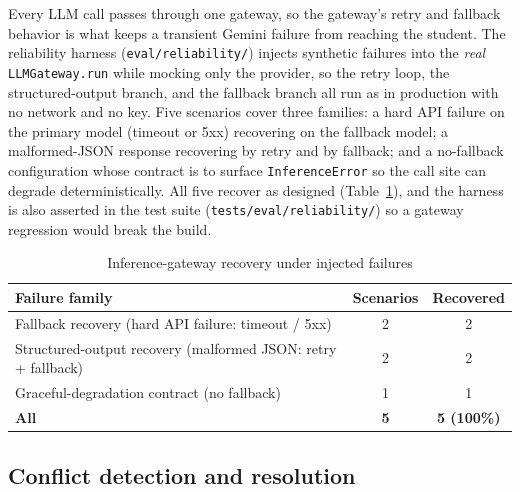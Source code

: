 \documentclass[../main.tex]{subfiles}
\begin{document}
Every \gls{LLM} call passes through one gateway, so the gateway's retry and fallback behavior is what keeps a transient Gemini failure from reaching the student.
The reliability harness (\texttt{eval/reliability/}) injects synthetic failures into the \textit{real} \texttt{LLMGateway.run} while mocking only the provider, so the retry loop, the structured-output branch, and the fallback branch all run as in production with no network and no key.
Five scenarios cover three families: a hard \gls{API} failure on the primary model (timeout or 5xx) recovering on the fallback model; a malformed-JSON response recovering by retry and by fallback; and a no-fallback configuration whose contract is to surface \texttt{InferenceError} so the call site can degrade deterministically.
All five recover as designed (Table~\ref{table:eval-reliability}), and the harness is also asserted in the test suite (\texttt{tests/eval/reliability/}) so a gateway regression would break the build.

\begin{table}[H]
    \centering
    \caption{Inference-gateway recovery under injected failures}
    \label{table:eval-reliability}
    \begin{tabular}{|p{8.5cm}|c|c|}
        \hline
        \textbf{Failure family} & \textbf{Scenarios} & \textbf{Recovered} \\
        \hline
        Fallback recovery (hard API failure: timeout / 5xx) & 2 & 2 \\
        \hline
        Structured-output recovery (malformed JSON: retry + fallback) & 2 & 2 \\
        \hline
        Graceful-degradation contract (no fallback) & 1 & 1 \\
        \hline
        \textbf{All} & \textbf{5} & \textbf{5 (100\%)} \\
        \hline
    \end{tabular}
\end{table}

\subsection{Conflict detection and resolution}
\label{subsection:4.4.6}
\end{document}
